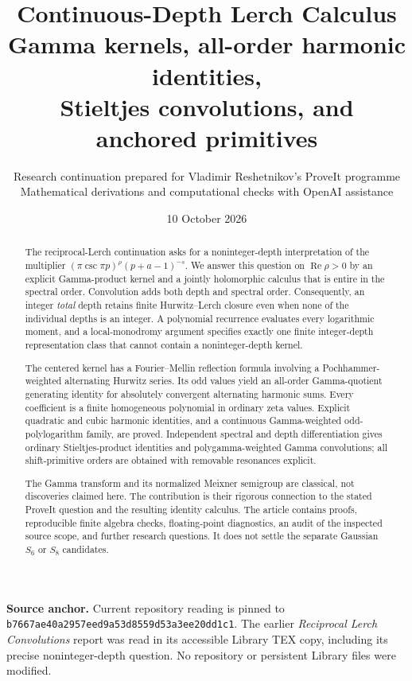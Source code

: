 \documentclass[11pt,letterpaper]{article}
\title{\textbf{Continuous-Depth Lerch Calculus}\\[5pt]
\large Gamma kernels, all-order harmonic identities,\\
Stieltjes convolutions, and anchored primitives}
\author{Research continuation prepared for Vladimir Reshetnikov's ProveIt programme\\
\small Mathematical derivations and computational checks with OpenAI assistance}
\date{10 October 2026}
\numberwithin{equation}{section}
\theoremstyle{definition}\newtheorem{definition}[theorem]{Definition}
\theoremstyle{remark}\newtheorem{remark}[theorem]{Remark}
\newcommand{\Rea}{\operatorname{Re}}\newcommand{\Ima}{\operatorname{Im}}
\newcommand{\src}[1]{\nolinkurl{#1}}
\newcommand{\pin}{\src{b7667ae40a2957eed9a53d8559d53a3ee20dd1c1}}
\begin{document}
\maketitle
\begin{abstract}
The reciprocal-Lerch continuation asks for a noninteger-depth interpretation
of the multiplier $(\pi\csc\pi p)^\rho(p+a-1)^{-s}$. We answer this question
on $\Rea\rho>0$ by an explicit Gamma-product kernel and a jointly holomorphic
calculus that is entire in the spectral order. Convolution adds both depth
and spectral order. Consequently, an integer \emph{total} depth retains
finite Hurwitz--Lerch closure even when none of the individual depths is
an integer. A polynomial recurrence evaluates every logarithmic moment,
and a local-monodromy argument specifies exactly one finite integer-depth
representation class that cannot contain a noninteger-depth kernel.

The centered kernel has a Fourier--Mellin reflection formula involving a
Pochhammer-weighted alternating Hurwitz series. Its odd values yield an
all-order Gamma-quotient generating identity for absolutely convergent
alternating harmonic sums. Every coefficient is a finite homogeneous
polynomial in ordinary zeta values. Explicit quadratic and cubic harmonic
identities, and a continuous Gamma-weighted odd-polylogarithm family, are
proved. Independent spectral and depth differentiation gives ordinary
Stieltjes-product identities and polygamma-weighted Gamma convolutions;
all shift-primitive orders are obtained with removable resonances explicit.

The Gamma transform and its normalized Meixner semigroup are classical,
not discoveries claimed here. The contribution is their rigorous connection
to the stated ProveIt question and the resulting identity calculus. The
article contains proofs, reproducible finite algebra checks, floating-point
diagnostics, an audit of the inspected source scope, and further research
questions. It does not settle the separate Gaussian $S_6$ or $S_8$ candidates.
\end{abstract}
\vspace{5pt}
\noindent\textbf{Source anchor.} Current repository reading is pinned to \pin.
The earlier \emph{Reciprocal Lerch Convolutions} report was read in its
accessible Library TEX copy, including its precise noninteger-depth
question. No repository or persistent Library files were modified.
\clearpage
\begingroup
\small
\setlength{\parskip}{0pt}
\tableofcontents
\endgroup
\clearpage
\end{document}
